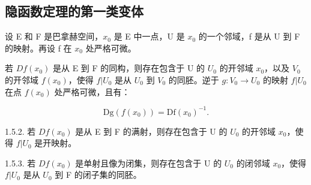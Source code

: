 \subsection{隐函数定理的第一类变体}

设 E 和 F 是巴拿赫空间，\(x_{0}\) 是 E 中一点，U 是 \(x_{0}\) 的一个邻域，f 是从 U 到 F 的映射。再设 f 在 \(x_{0}\) 处严格可微。

若 \(Df(x_0)\) 是从 E 到 F 的同构，则存在包含于 U 的 \(U_0\) 的开邻域 \(x_0\)，以及 \(V_0\) 的开邻域 \(f(x_0)\)，使得 \(f|U_0\) 是从 \(U_0\) 到 \(V_0\) 的同胚。逆于 \(g: V_0 \to U_0\) 的映射 \(f|U_0\) 在点 \(f(x_0)\) 处严格可微，且有：

\[
\mathrm{Dg} (f (x _ {0})) = \mathrm{Df} (x _ {0}) ^ {- 1}.
\]

1.5.2. 若 \(Df(x_{0})\) 是从 E 到 F 的满射，则存在包含于 U 的 \(U_{0}\) 的开邻域 \(x_{0}\)，使得 \(f|U_{0}\) 是开映射。

1.5.3. 若 \(Df(x_{0})\) 是单射且像为闭集，则存在包含于 U 的 \(U_{0}\) 的闭邻域 \(x_{0}\)，使得 \(f|U_{0}\) 是从 \(U_{0}\) 到 F 的闭子集的同胚。

